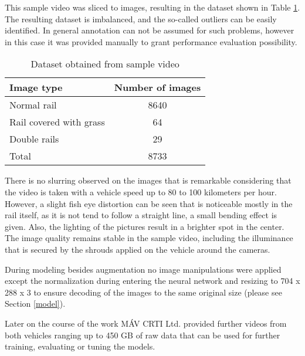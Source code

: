 This sample video was sliced to images, resulting in the dataset shown in Table \ref{table:dataset}.
The resulting dataset is imbalanced, and the so-called outliers can be easily identified.
In general annotation can not be assumed for such problems, however in this case it was
provided manually to grant performance evaluation possibility.

\begin{table}[!ht]
    \centering
    \begin{tabular}{l c}
        Image type              & Number of images \\
        \hline
        Normal rail             & 8640             \\
        Rail covered with grass & 64               \\
        Double rails            & 29               \\
        \hline
        Total                   & 8733             \\
    \end{tabular}
    \caption{Dataset obtained from sample video}
    \label{table:dataset}
\end{table}

There is no slurring observed on the images that is remarkable considering that the video is taken
with a vehicle speed up to 80 to 100 kilometers per hour.
However, a slight fish eye distortion can be seen that is noticeable mostly in the rail itself,
as it is not tend to follow a straight line, a small bending effect is given.
Also, the lighting of the pictures result in a brighter spot in the center.
The image quality remains stable in the sample video, including the illuminance that is
secured by the shrouds applied on the vehicle around the cameras.

During modeling besides augmentation no image manipulations were applied
except the normalization during entering the neural network
and resizing to 704 x 288 x 3 to ensure decoding of the images to the same original size
(please see Section \ref{model}).

Later on the course of the work MÁV CRTI Ltd. provided further videos from both vehicles
ranging up to 450 GB of raw data that can be used for further training, evaluating or tuning
the models.